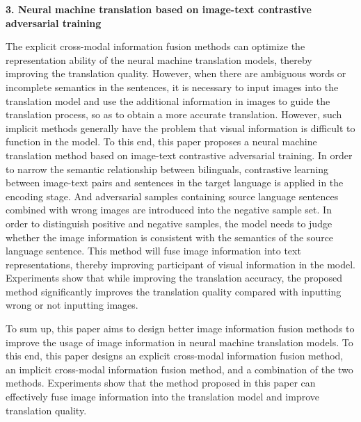 \textbf{3. Neural machine translation based on image-text contrastive adversarial training}

The explicit cross-modal information fusion methods can optimize the representation ability of the neural machine translation models, thereby improving the translation quality. However, when there are ambiguous words or incomplete semantics in the sentences, it is necessary to input images into the translation model and use the additional information in images to guide the translation process, so as to obtain a more accurate translation. However, such implicit methods generally have the problem that visual information is difficult to function in the model. To this end, this paper proposes a neural machine translation method based on image-text contrastive adversarial training. In order to narrow the semantic relationship between bilinguals, contrastive learning between image-text pairs and sentences in the target language is applied in the encoding stage. And adversarial samples containing source language sentences combined with wrong images are introduced into the negative sample set. In order to distinguish positive and negative samples, the model needs to judge whether the image information is consistent with the semantics of the source language sentence. This method will fuse image information into text representations, thereby improving participant of visual information in the model. Experiments show that while improving the translation accuracy, the proposed method significantly improves the translation quality compared with inputting wrong or not inputting images.

To sum up, this paper aims to design better image information fusion methods to improve the usage of image information in neural machine translation models. To this end, this paper designs an explicit cross-modal information fusion method, an implicit cross-modal information fusion method, and a combination of the two methods. Experiments show that the method proposed in this paper can effectively fuse image information into the translation model and improve translation quality.

